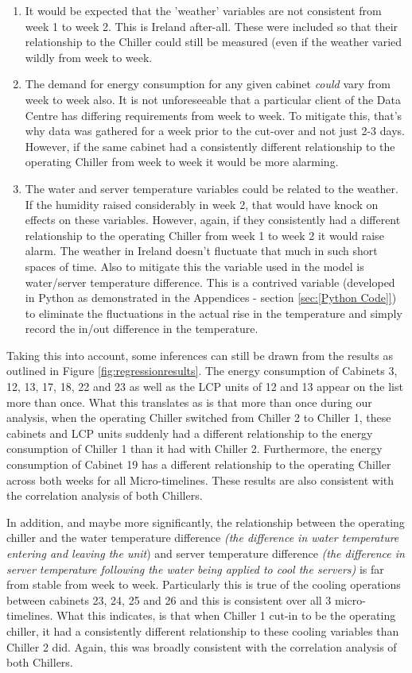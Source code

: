 \documentclass[12pt]{scrartcl}
\begin{document}
\begin{enumerate}
\item It would be expected that the 'weather' variables are not consistent from week 1 to week 2. This is Ireland after-all. These were included so that their relationship to the Chiller could still be measured (even if the weather varied wildly from week to week. 
\item The demand for energy consumption for any given cabinet \textit{could} vary from week to week also. It is not unforeseeable that a particular client of the Data Centre has differing requirements from week to week. To mitigate this, that's why data was gathered for a week prior to the cut-over and not just 2-3 days. However, if the same cabinet had a consistently different relationship to the operating Chiller from week to week it would be more alarming.    
\item The water and server temperature variables could be related to the weather. If the humidity raised considerably in week 2, that would have knock on effects on these variables. However, again, if they consistently had a different relationship to the operating Chiller from week 1 to week 2 it would raise alarm. The weather in Ireland doesn't fluctuate that much in such short spaces of time. Also to mitigate this the variable used in the model is water/server temperature difference. This is a contrived variable (developed in Python as demonstrated in the Appendices - section \ref{sec:[Python Code]}) to eliminate the fluctuations in the actual rise in the temperature and simply record the in/out difference in the temperature.  
\end{enumerate} 

Taking this into account, some inferences can still be drawn from the results as outlined in Figure \ref{fig:regressionresults}. The energy consumption of Cabinets 3, 12, 13, 17, 18, 22 and 23 as well as the LCP units of 12 and 13 appear on the list more than once. What this translates as is that more than once during our analysis, when the operating Chiller switched from Chiller 2 to Chiller 1, these cabinets and LCP units suddenly had a different relationship to the energy consumption of Chiller 1 than it had with Chiller 2. Furthermore, the energy consumption of Cabinet 19 has a different relationship to the operating Chiller across both weeks for all Micro-timelines. These results are also consistent with the correlation analysis of both Chillers. 

In addition, and maybe more significantly, the relationship between the operating chiller and the water temperature difference \textit{(the difference in water temperature entering and leaving the unit}) and server temperature difference \textit{(the difference in server temperature following the water being applied to cool the servers)} is far from stable from week to week. Particularly this is true of the cooling operations between cabinets 23, 24, 25 and 26 and this is consistent over all 3 micro-timelines. What this indicates, is that when Chiller 1 cut-in to be the operating chiller, it had a consistently different relationship to these cooling variables than Chiller 2 did. Again, this was broadly consistent with the correlation analysis of both Chillers.
\end{document}
